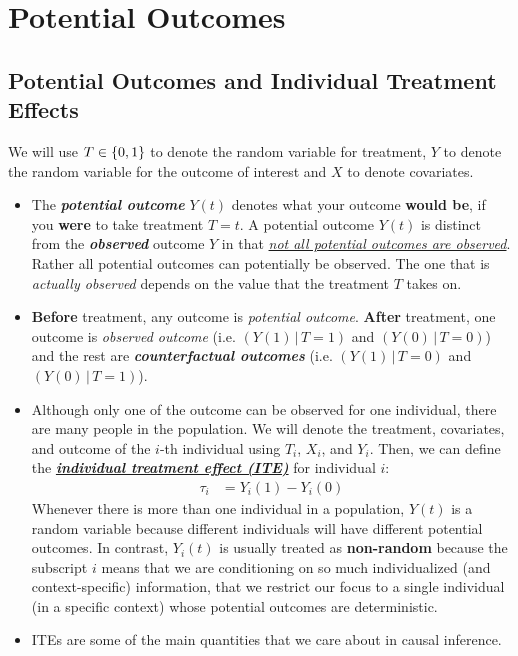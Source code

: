 \documentclass[11pt]{article}
\begin{document}
\section{Potential Outcomes}
\subsection{Potential Outcomes and Individual Treatment Effects}
We will use $T \in  \left\{0, 1\right\}$ to denote the random variable for treatment,  $Y$ to denote the random variable for the outcome of interest and $X$ to denote covariates. 
\begin{itemize}
\item The \emph{\textbf{potential outcome}} $Y(t)$ denotes what your outcome \textbf{would be}, if you \textbf{were} to take treatment $T=t$. A potential outcome $Y(t)$ is distinct from the \emph{\textbf{observed}} outcome $Y$ in that \underline{\emph{not all potential outcomes are observed}}. Rather all potential outcomes can potentially be observed. The one that is \emph{actually observed} depends on the value that the treatment $T$ takes on.

\item \textbf{Before} treatment, any outcome is \emph{potential outcome}. \textbf{After} treatment, one outcome is \emph{observed outcome} (i.e. $(Y(1)\, |\, T=1)$ and $(Y(0)\, |\, T=0)$) and the rest are \emph{\textbf{counterfactual outcomes}} (i.e. $(Y(1)\, |\, T=0)$ and $(Y(0)\, |\, T=1)$).

\item Although only one of the outcome can be observed for one individual, there are many people in the population. We will denote the treatment, covariates, and
outcome of the $i$-th individual using $T_i$,  $X_i$, and $Y_i$. Then, we can define the \underline{\emph{\textbf{individual treatment effect (ITE)}}} \citep{neal2020introduction} for individual $i$:
\begin{align}
\tau_i &= Y_i(1) - Y_i(0) \label{eqn: ITE}
\end{align} Whenever there is more than one individual in a population, $Y(t)$ is a random variable because different individuals will have different potential
outcomes. In contrast, $Y_i(t)$  is usually treated as \textbf{non-random} because the subscript $i$ means that we are conditioning on so much individualized (and context-specific) information, that we restrict our focus to a single individual (in a specific context) whose potential outcomes are deterministic.

\item ITEs are some of the main quantities that we care about in causal inference.
\end{itemize}
\end{document}
